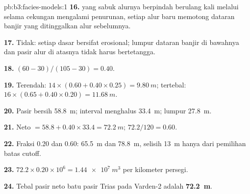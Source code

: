 \begin{solution}{pb:b3:facies-models:1}
\textbf{16.}  yang sabuk alurnya berpindah berulang kali
melalui  selama cekungan mengalami penurunan, setiap alur baru memotong
dataran banjir yang ditinggalkan alur sebelumnya.

\textbf{17.} Tidak: setiap dasar bersifat erosional; lumpur dataran banjir di
bawahnya dan pasir alur di atasnya tidak harus bertetangga.

\textbf{18.} $(60 - 30)/(105 - 30) = 0.40$.

\textbf{19.} Terendah: $14\times(0.60 + 0.40\times0.25) = \qty{9.80}{m}$;
tertebal: $16\times(0.65 + 0.40\times0.20) = \qty{11.68}{m}$.

\textbf{20.} Pasir bersih \qty{58.8}{m}; interval menghalus \qty{33.4}{m}; lumpur
\qty{27.8}{m}.

\textbf{21.} Neto $= 58.8 + 0.40\times33.4 = \qty{72.2}{m}$;  $72.2/120 = 0.60$.

\textbf{22.} Fraksi 0.20 dan 0.60: \qty{65.5}{m} dan \qty{78.8}{m}, selisih
\qty{13}{m} hanya dari pemilihan batas cutoff.

\textbf{23.} $72.2\times0.20\times10^6 = \qty{1.44e7}{m^3}$ per kilometer
persegi.

\textbf{24.} Tebal pasir neto batu pasir Trias pada Varden-2 adalah
\textbf{\qty[text-series-to-math=true]{72.2}{m}}.
\end{solution}
